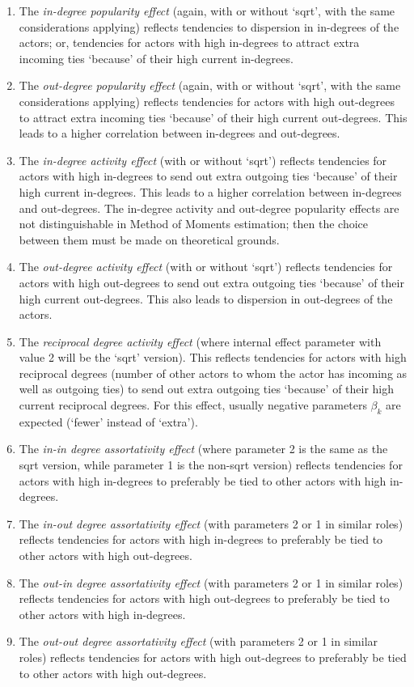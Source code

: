 \documentclass[a4paper,fleqn,11pt]{article}
\newcommand{\+}{\, + \,}
\begin{document}
\begin{enumerate}
\item The \emph{in-degree popularity effect} (again, with or without `sqrt',
     with the same considerations applying)
     reflects tendencies to dispersion in in-degrees of the actors;
     or, tendencies for actors with high in-degrees to attract extra incoming ties
     `because' of their high current in-degrees.
\item The \emph{out-degree popularity effect} (again, with or without `sqrt',
     with the same considerations applying)
     reflects tendencies for
     actors with high out-degrees to attract extra incoming ties
     `because' of their high current out-degrees.
     This leads to a higher correlation between in-degrees and out-degrees.
\item The \emph{in-degree activity effect} (with or without `sqrt')
     reflects tendencies for
     actors with high in-degrees to send out extra outgoing ties
     `because' of their high current in-degrees.
     This leads to a higher correlation between in-degrees and out-degrees.
     The in-degree activity and out-degree popularity effects are
     not distinguishable in Method of Moments estimation; then the choice between them
     must be made on theoretical grounds.
\item The \emph{out-degree activity effect} (with or without `sqrt')
     reflects tendencies for
     actors with high out-degrees to send out extra outgoing ties
     `because' of their high current out-degrees.
     This also leads to dispersion in out-degrees of the actors.
\item The \emph{ reciprocal degree activity effect} (where internal effect
     parameter with value 2 will be the `sqrt' version).
     This reflects tendencies for
     actors with high reciprocal degrees (number of other actors
     to whom the actor has incoming as well as outgoing ties) to send out extra outgoing ties
     `because' of their high current  reciprocal degrees.
     For this effect, usually negative parameters $\beta_k$
     are expected (`fewer' instead of `extra').
\item The \emph{in-in degree assortativity effect} (where parameter 2 is the same
    as the sqrt version, while parameter 1 is the non-sqrt version)
     reflects tendencies for actors with high in-degrees
     to preferably be tied to other actors with high in-degrees.
\item The \emph{in-out degree assortativity effect} (with parameters
     2 or 1 in similar roles)
     reflects tendencies for actors with high in-degrees
     to preferably be tied to other actors with high out-degrees.
\item The \emph{out-in degree assortativity effect} (with parameters
     2 or 1 in similar roles)
     reflects tendencies for actors with high out-degrees
     to preferably be tied to other actors with high in-degrees.
\item The \emph{out-out degree assortativity effect} (with parameters
     2 or 1 in similar roles)
     reflects tendencies for actors with high out-degrees
     to preferably be tied to other actors with high out-degrees.
\end{enumerate}
\end{document}
